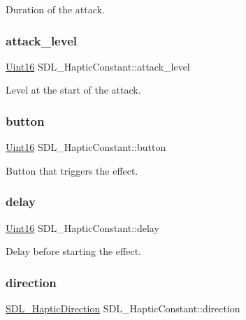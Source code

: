Duration of the attack. \mbox{\label{struct_s_d_l___haptic_constant_a0928a37f3fab0e5b7daffc7a1d65744c}} 
\subsubsection{\texorpdfstring{attack\_level}{attack\_level}}
{\footnotesize\ttfamily \mbox{\hyperlink{_s_d_l__stdinc_8h_a31fcc0a076c9068668173ee26d33e42b}{Uint16}} S\+D\+L\+\_\+\+Haptic\+Constant\+::attack\+\_\+level}

Level at the start of the attack. \mbox{\label{struct_s_d_l___haptic_constant_aa65321f1b002adaab6e629d5bed556e9}} 
\subsubsection{\texorpdfstring{button}{button}}
{\footnotesize\ttfamily \mbox{\hyperlink{_s_d_l__stdinc_8h_a31fcc0a076c9068668173ee26d33e42b}{Uint16}} S\+D\+L\+\_\+\+Haptic\+Constant\+::button}

Button that triggers the effect. \mbox{\label{struct_s_d_l___haptic_constant_a16a751009893f5412201e3ce91146b25}} 
\subsubsection{\texorpdfstring{delay}{delay}}
{\footnotesize\ttfamily \mbox{\hyperlink{_s_d_l__stdinc_8h_a31fcc0a076c9068668173ee26d33e42b}{Uint16}} S\+D\+L\+\_\+\+Haptic\+Constant\+::delay}

Delay before starting the effect. \mbox{\label{struct_s_d_l___haptic_constant_a3e871debf4e57c35960f019d2605d84f}} 
\subsubsection{\texorpdfstring{direction}{direction}}
{\footnotesize\ttfamily \mbox{\hyperlink{struct_s_d_l___haptic_direction}{S\+D\+L\+\_\+\+Haptic\+Direction}} S\+D\+L\+\_\+\+Haptic\+Constant\+::direction}

